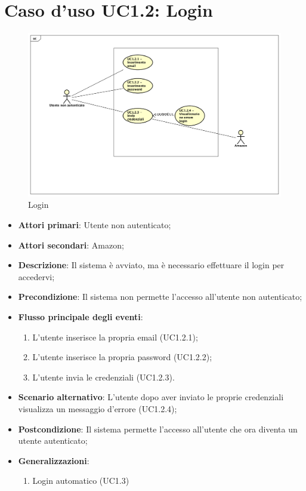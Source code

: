 \section{Caso d'uso UC1.2: Login}
\begin{figure} [h]
	\centering
	\includegraphics[scale=0.4]{./Diagram/UC1-2.png}
	\caption{Login}\label{}
\end{figure}
\begin{itemize}
	\item \textbf{Attori primari}: Utente non autenticato;
	\item \textbf{Attori secondari}: Amazon;
	\item \textbf{Descrizione}: Il sistema è avviato, ma è necessario effettuare il login per accedervi;
	\item \textbf{Precondizione}: Il sistema non permette l'accesso all'utente non autenticato;
	\item \textbf{Flusso principale degli eventi}:
	\begin{enumerate}
		\item L'utente inserisce la propria email (UC1.2.1);
		\item L'utente inserisce la propria password (UC1.2.2);
		\item L'utente invia le credenziali (UC1.2.3).
	\end{enumerate}
	\item \textbf{Scenario alternativo}: L'utente dopo aver inviato le proprie credenziali visualizza un messaggio d'errore (UC1.2.4);
	\item \textbf{Postcondizione}: Il sistema permette l'accesso all'utente che ora diventa un utente autenticato; 
	\item \textbf{Generalizzazioni}:
	\begin{enumerate}
		\item Login automatico (UC1.3)
	\end{enumerate}
\end{itemize}

